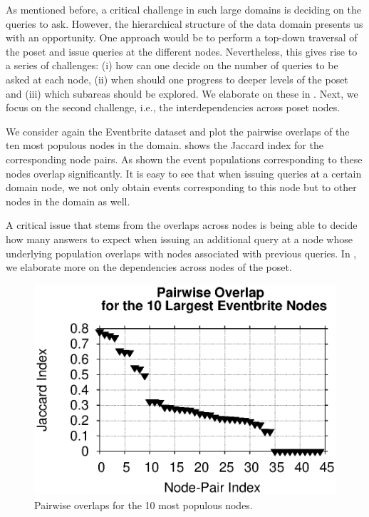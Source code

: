 As mentioned before, a critical challenge in such large domains is deciding on the queries to ask. However, the hierarchical structure of the data domain presents us with an opportunity. One approach would be to perform a top-down traversal of the poset and issue queries at the different nodes. Nevertheless, this gives rise to a series of challenges: (i) how can one decide on the number of queries to be asked at each node, (ii) when should one progress to deeper levels of the poset and (iii) which subareas should be explored. We elaborate on these in . Next, we focus on the second challenge, i.e., the interdependencies across poset nodes. 
\begin{example}
We consider again the Eventbrite dataset and plot the pairwise overlaps of the ten most populous nodes in the domain.  shows the Jaccard index for the corresponding node pairs. As shown the event populations corresponding to these nodes overlap significantly. It is easy to see that when issuing queries at a certain domain node, we not only obtain events corresponding to this node but to other nodes in the domain as well.
\end{example}
A critical issue that stems from the overlaps across nodes is being able to decide how many answers to expect when issuing an additional query at a node whose underlying population overlaps with nodes associated with previous queries. In , we elaborate more on the dependencies across nodes of the poset.

\begin{figure}
	\begin{center}
	\vspace{-10pt}
	\includegraphics[clip,scale=0.5]{figs/overlaps.eps}
	\vspace{-10pt}
	\caption{Pairwise overlaps for the 10 most populous nodes.}
	\label{fig:eventbriteover}
	\vspace{-20pt}
	\end{center}
\end{figure}

